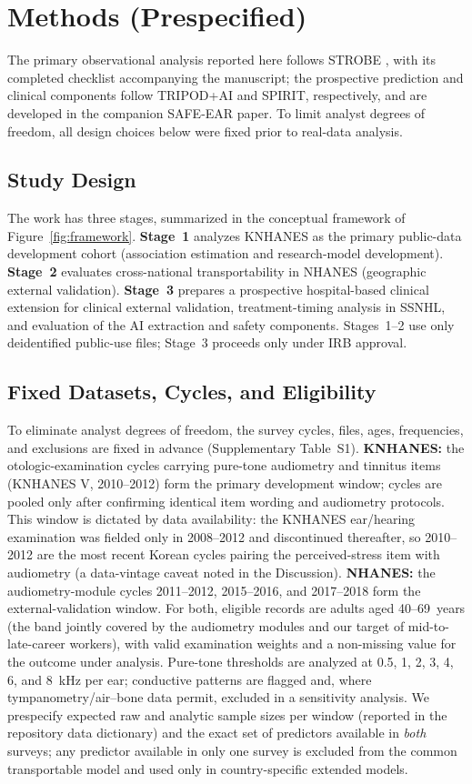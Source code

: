 \section{Methods (Prespecified)}
The primary observational analysis reported here follows STROBE \citep{vonelm2007strobe}, with its completed checklist accompanying the manuscript; the prospective prediction and clinical components follow TRIPOD+AI \citep{collins2024tripodai} and SPIRIT, respectively, and are developed in the companion SAFE-EAR paper. To limit analyst degrees of freedom, all design choices below were fixed prior to real-data analysis.

\subsection{Study Design}
The work has three stages, summarized in the conceptual framework of Figure~\ref{fig:framework}. \textbf{Stage~1} analyzes KNHANES as the primary public-data development cohort (association estimation and research-model development). \textbf{Stage~2} evaluates cross-national transportability in NHANES (geographic external validation). \textbf{Stage~3} prepares a prospective hospital-based clinical extension for clinical external validation, treatment-timing analysis in SSNHL, and evaluation of the AI extraction and safety components. Stages~1--2 use only deidentified public-use files; Stage~3 proceeds only under IRB approval.

\subsection{Fixed Datasets, Cycles, and Eligibility}
To eliminate analyst degrees of freedom, the survey cycles, files, ages, frequencies, and exclusions are fixed in advance (Supplementary Table~S1). \textbf{KNHANES:} the otologic-examination cycles carrying pure-tone audiometry and tinnitus items (KNHANES V, 2010--2012) form the primary development window; cycles are pooled only after confirming identical item wording and audiometry protocols. This window is dictated by data availability: the KNHANES ear/hearing examination was fielded only in 2008--2012 and discontinued thereafter, so 2010--2012 are the most recent Korean cycles pairing the perceived-stress item with audiometry (a data-vintage caveat noted in the Discussion). \textbf{NHANES:} the audiometry-module cycles 2011--2012, 2015--2016, and 2017--2018 form the external-validation window. For both, eligible records are adults aged 40--69~years (the band jointly covered by the audiometry modules and our target of mid-to-late-career workers), with valid examination weights and a non-missing value for the outcome under analysis. Pure-tone thresholds are analyzed at 0.5, 1, 2, 3, 4, 6, and 8~kHz per ear; conductive patterns are flagged and, where tympanometry/air--bone data permit, excluded in a sensitivity analysis. We prespecify expected raw and analytic sample sizes per window (reported in the repository data dictionary) and the exact set of predictors available in \emph{both} surveys; any predictor available in only one survey is excluded from the common transportable model and used only in country-specific extended models.

